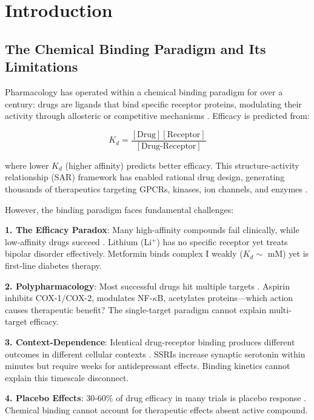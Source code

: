 \documentclass{article}
\begin{document}
\newpage
\tableofcontents
\newpage

\section{Introduction}

\subsection{The Chemical Binding Paradigm and Its Limitations}

Pharmacology has operated within a chemical binding paradigm for over a century: drugs are ligands that bind specific receptor proteins, modulating their activity through allosteric or competitive mechanisms \citep{Kenakin2012}. Efficacy is predicted from:

\begin{equation}
K_d = \frac{[\text{Drug}][\text{Receptor}]}{[\text{Drug-Receptor}]}
\end{equation}

where lower $K_d$ (higher affinity) predicts better efficacy. This structure-activity relationship (SAR) framework has enabled rational drug design, generating thousands of therapeutics targeting GPCRs, kinases, ion channels, and enzymes \citep{Overington2006}.

However, the binding paradigm faces fundamental challenges:

\textbf{1. The Efficacy Paradox}: Many high-affinity compounds fail clinically, while low-affinity drugs succeed \citep{Swinney2011}. Lithium (Li$^+$) has no specific receptor yet treats bipolar disorder effectively. Metformin binds complex I weakly ($K_d \sim$ mM) yet is first-line diabetes therapy.

\textbf{2. Polypharmacology}: Most successful drugs hit multiple targets \citep{Hopkins2008}. Aspirin inhibits COX-1/COX-2, modulates NF-$\kappa$B, acetylates proteins—which action causes therapeutic benefit? The single-target paradigm cannot explain multi-target efficacy.

\textbf{3. Context-Dependence}: Identical drug-receptor binding produces different outcomes in different cellular contexts \citep{Urban2015}. SSRIs increase synaptic serotonin within minutes but require weeks for antidepressant effects. Binding kinetics cannot explain this timescale disconnect.

\textbf{4. Placebo Effects}: 30-60\% of drug efficacy in many trials is placebo response \citep{Benedetti2014}. Chemical binding cannot account for therapeutic effects absent active compound.
\end{document}
